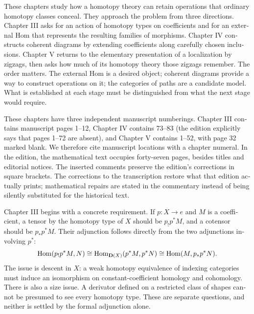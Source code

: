 \begin{otherlanguage}{english}
These chapters study how a homotopy theory can retain operations that
ordinary homotopy classes conceal. They approach the problem from three directions.
Chapter III asks for an action of homotopy types on coefficients and for an
external Hom that represents the resulting families of morphisms. Chapter IV
constructs coherent diagrams by extending coefficients along carefully chosen
inclusions. Chapter V returns to the elementary presentation of a localization
by zigzags, then asks how much of its homotopy theory those zigzags remember.
The order matters. The external Hom is a desired object; coherent diagrams
provide a way to construct operations on it; the categories of paths are a
candidate model. What is established at each stage must be distinguished from
what the next stage would require.

These chapters have three independent manuscript numberings. Chapter III
contains manuscript pages 1--12, Chapter IV contains 73--83 (the edition
explicitly says that pages 1--72 are absent), and Chapter V contains 1--52,
with page 32 marked blank. We therefore cite manuscript locations with a
chapter numeral. In the edition, the mathematical text occupies forty-seven pages, besides
titles and editorial notices.
The inserted comments preserve the edition's corrections in square brackets.
The corrections to the transcription restore what that edition actually prints;
mathematical repairs are stated in the commentary instead of being silently
substituted for the historical text.

Chapter III begins with a concrete requirement. If $p:X\to e$ and $M$ is a
coefficient, a tensor by the homotopy type of $X$ should be $p_!p^*M$, and a
cotensor should be $p_*p^*M$. Their adjunction follows directly from the two
adjunctions involving $p^*$:
\[
 \mathrm{Hom}(p_!p^*M,N)\cong\mathrm{Hom}_{\mathbf{D}(X)}(p^*M,p^*N)
 \cong\mathrm{Hom}(M,p_*p^*N).
\]
The issue is descent in $X$: a weak homotopy equivalence of indexing categories
must induce an isomorphism on constant-coefficient homology and cohomology.
There is also a size issue. A derivator defined on a restricted class of
shapes cannot be presumed to see every homotopy type. These are separate
questions, and neither is settled by the formal adjunction alone.


\end{otherlanguage}
